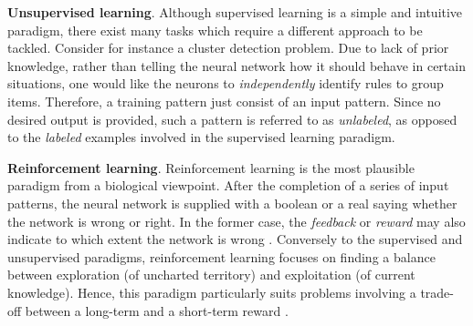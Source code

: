 \documentclass[12pt, a4paper, twoside, openright]{report}
\numberwithin{equation}{chapter}
\theoremstyle{theorem}
\theoremstyle{definition}
\theoremstyle{remark}
\theoremstyle{proposition}
\numberwithin{figure}{chapter}
\begin{document}
		\noindent \textbf{Unsupervised learning}. Although supervised learning is a simple and intuitive paradigm, there exist many tasks which require a different approach to be tackled. Consider for instance a cluster detection problem. Due to lack of prior knowledge, rather than telling the neural network how it should behave in certain situations, one would like the neurons to \emph{independently} identify rules to group items. Therefore, a training pattern just consist of an input pattern. Since no desired output is provided, such a pattern is referred to as \emph{unlabeled}, as opposed to the \emph{labeled} examples involved in the supervised learning paradigm.
		
		\vspace*{0.3cm}
		
		\noindent \textbf{Reinforcement learning}. Reinforcement learning is the most plausible paradigm from a biological viewpoint. After the completion of a series of input patterns, the neural network is supplied with a boolean or a real saying whether the network is wrong or right. In the former case, the \emph{feedback} or \emph{reward} may also indicate to which extent the network is wrong \cite{Kri}. Conversely to the supervised and unsupervised paradigms, reinforcement learning focuses on finding a balance between exploration (of uncharted territory) and exploitation (of current knowledge). Hence, this paradigm particularly suits problems involving a trade-off between a long-term and a short-term reward \cite{KLM96}.
		
		\vspace*{0.3cm}
		
\end{document}
